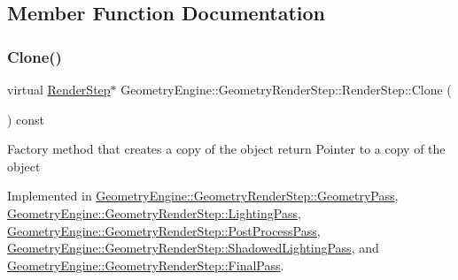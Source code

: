 \subsection{Member Function Documentation}
\mbox{\label{class_geometry_engine_1_1_geometry_render_step_1_1_render_step_afe33ea9d82c5be11f55af7d39691d44b}} 
\subsubsection{\texorpdfstring{Clone()}{Clone()}}
{\footnotesize\ttfamily virtual \mbox{\hyperlink{class_geometry_engine_1_1_geometry_render_step_1_1_render_step}{Render\+Step}}$\ast$ Geometry\+Engine\+::\+Geometry\+Render\+Step\+::\+Render\+Step\+::\+Clone (\begin{DoxyParamCaption}{ }\end{DoxyParamCaption}) const\hspace{0.3cm}{\ttfamily [pure virtual]}}

Factory method that creates a copy of the object return Pointer to a copy of the object 

Implemented in \mbox{\hyperlink{class_geometry_engine_1_1_geometry_render_step_1_1_geometry_pass_a12e85a0169cb7b92cb8bd7b7fe100b33}{Geometry\+Engine\+::\+Geometry\+Render\+Step\+::\+Geometry\+Pass}}, \mbox{\hyperlink{class_geometry_engine_1_1_geometry_render_step_1_1_lighting_pass_a4f1cb36c7bf6a90d0aa3b8e8feba5e5e}{Geometry\+Engine\+::\+Geometry\+Render\+Step\+::\+Lighting\+Pass}}, \mbox{\hyperlink{class_geometry_engine_1_1_geometry_render_step_1_1_post_process_pass_afcf20dc0a20cf1e0fb730c7b56071c26}{Geometry\+Engine\+::\+Geometry\+Render\+Step\+::\+Post\+Process\+Pass}}, \mbox{\hyperlink{class_geometry_engine_1_1_geometry_render_step_1_1_shadowed_lighting_pass_a73176d6860aee0903034eeaf93edb40d}{Geometry\+Engine\+::\+Geometry\+Render\+Step\+::\+Shadowed\+Lighting\+Pass}}, and \mbox{\hyperlink{class_geometry_engine_1_1_geometry_render_step_1_1_final_pass_a6633ed9c32944cc390d2b0ab32225845}{Geometry\+Engine\+::\+Geometry\+Render\+Step\+::\+Final\+Pass}}.

\mbox{\label{class_geometry_engine_1_1_geometry_render_step_1_1_render_step_afe0321446beeb4093dba701424ec1e8c}} 
